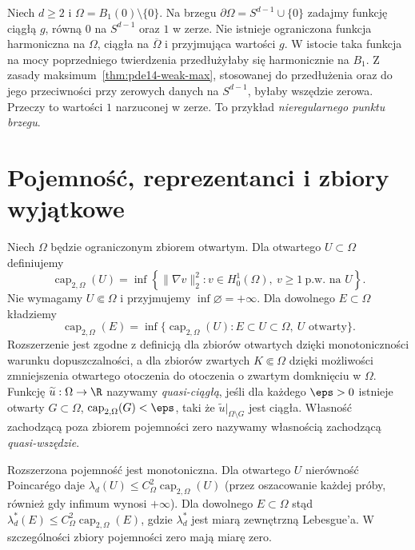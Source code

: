 \begin{przyklad}
\label{ex:pde19-irregular}
Niech $d\ge2$ i $\Omega=B_1(0)\setminus\{0\}$.
Na brzegu $\partial\Omega=S^{d-1}\cup\{0\}$ zadajmy
funkcję ciągłą $g$, równą $0$ na $S^{d-1}$ oraz $1$ w zerze.
Nie istnieje ograniczona funkcja harmoniczna na $\Omega$,
ciągła na $\overline\Omega$ i przyjmująca wartości $g$.
W istocie taka funkcja na mocy poprzedniego twierdzenia
przedłużyłaby się harmonicznie na $B_1$. Z zasady maksimum~\ref{thm:pde14-weak-max},
stosowanej do przedłużenia oraz do jego przeciwności
przy zerowych danych na $S^{d-1}$, byłaby wszędzie zerowa.
Przeczy to wartości $1$ narzuconej w zerze.
To przykład \emph{nieregularnego punktu brzegu}.
\end{przyklad}

\section{Pojemność, reprezentanci i zbiory wyjątkowe}
\label{sec:pde19-quasi}
\begin{definicja}
Niech $\Omega$ będzie ograniczonym zbiorem otwartym.
Dla otwartego $U\subset\Omega$ definiujemy
\[
 \operatorname{cap}_{2,\Omega}(U)=\inf\left\{
 \|\nabla v\|_2^2:v\in H_0^1(\Omega),\
 v\ge1\ \text{p.w. na }U\right\}.
\]
Nie wymagamy $U\Subset\Omega$ i przyjmujemy
$\inf\varnothing=+\infty$.
Dla dowolnego $E\subset\Omega$ kładziemy
\[
 \operatorname{cap}_{2,\Omega}(E)
 =\inf\{\operatorname{cap}_{2,\Omega}(U):E\subset U\subset\Omega,
 \ U\text{ otwarty}\}.
\]
Rozszerzenie jest zgodne z definicją dla zbiorów
otwartych dzięki monotoniczności warunku dopuszczalności,
a dla zbiorów zwartych $K\Subset\Omega$ dzięki możliwości
zmniejszenia otwartego otoczenia do otoczenia
o zwartym domknięciu w $\Omega$.
Funkcję $\widetilde u:\Omega\to\R$ nazywamy
\emph{quasi-ciągłą}, jeśli dla każdego $\eps>0$
istnieje otwarty $G\subset\Omega$,
$\operatorname{cap}_{2,\Omega}(G)<\eps$, taki że
$\widetilde u|_{\Omega\setminus G}$ jest ciągła.
Własność zachodzącą poza zbiorem pojemności zero nazywamy
własnością zachodzącą \emph{quasi-wszędzie}.
\end{definicja}

\begin{uwaga}
Rozszerzona pojemność jest monotoniczna. Dla otwartego
$U$ nierówność Poincarégo daje
$\lambda_d(U)\le C_\Omega^2\operatorname{cap}_{2,\Omega}(U)$
(przez oszacowanie każdej próby, również gdy infimum
wynosi $+\infty$). Dla dowolnego $E\subset\Omega$ stąd
$\lambda_d^*(E)\le C_\Omega^2\operatorname{cap}_{2,\Omega}(E)$,
gdzie $\lambda_d^*$ jest miarą zewnętrzną Lebesgue'a.
W szczególności zbiory pojemności zero mają miarę zero.
\end{uwaga}

